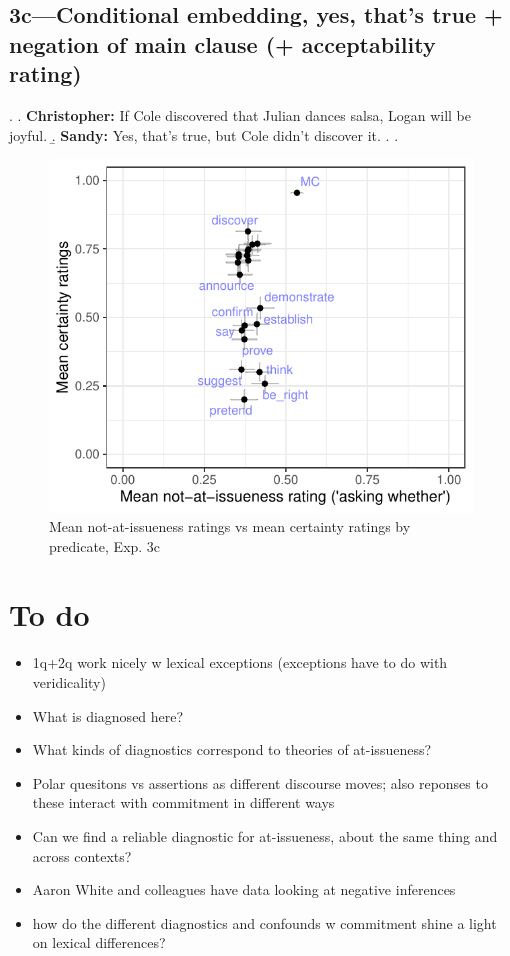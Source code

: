 \documentclass[11pt]{article}
\begin{document}
	\subsection{3c---Conditional embedding, yes, that's true + negation of main clause (+ acceptability rating)} %
		\ex. \a. \textbf{Christopher:} If Cole discovered that Julian dances salsa, Logan will be joyful.
			\b. \textbf{Sandy:} Yes, that’s true, but Cole didn't discover it.
			\z.
		\z.

		\begin{figure}[h]
			\centering
			\includegraphics[scale=0.85]{figures/c3-correl.pdf}
			\caption{Mean not-at-issueness ratings vs mean certainty ratings by predicate, Exp. 3c}
			\label{fig:m1-corr}
		\end{figure}


\pagebreak
\section{To do} %
	
	\begin{itemize}
		\item 1q+2q work nicely w lexical exceptions (exceptions have to do with veridicality)
		\item What is diagnosed here?
		\item What kinds of diagnostics correspond to theories of at-issueness?
		\item Polar quesitons vs assertions as different discourse moves; also reponses to these interact with commitment in different ways
		\item Can we find a reliable diagnostic for at-issueness, about the same thing and across contexts?
		\item Aaron White and colleagues have data looking at negative inferences
		\item how do the different diagnostics and confounds w commitment shine a light on lexical differences?
	\end{itemize}


\end{document}
